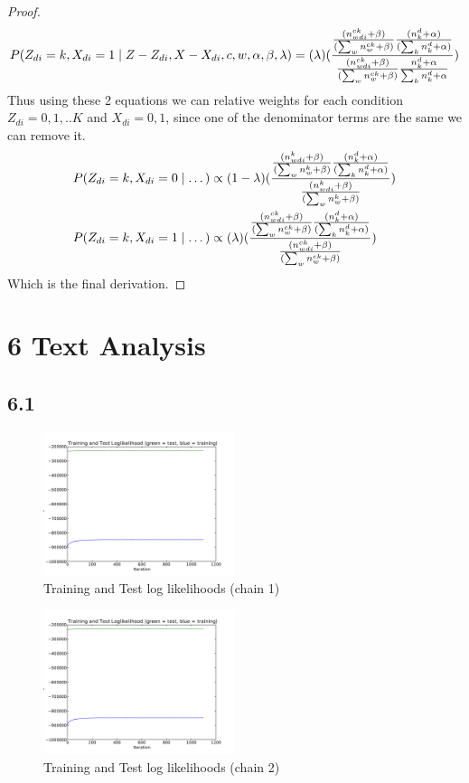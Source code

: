 \documentclass{article}
\begin{document}
\begin{proof}
\begin{align*}
P(Z_{di} = k, X_{di} =1 \mid Z - Z_{di}, X - X_{di}, c, w, \alpha,\beta,\lambda) &= (\lambda) (\frac {\frac{(n^{ck}_{wdi} + \beta)}{( \sum_w n^{ck}_w + \beta)} \frac{(n^d_k + \alpha)}{(\sum_k n^d_k + \alpha)}}{\frac{(n^{ck}_{wdi} + \beta)}{(\sum_w n^{ck}_w + \beta)} \frac{n^d_k + \alpha}{\sum_k n^d_k + \alpha}})\\
\end{align*}
 Thus using these 2 equations we can relative weights for each condition $Z_{di} = 0,1,..K$ and $X_{di} = 0,1$, since one of the denominator terms are the same we can remove it.
\begin{align*}
P(Z_{di} = k, X_{di} =0 \mid \dots) &\propto (1-\lambda) (\frac {\frac{(n^{k}_{wdi} + \beta)}{( \sum_w n^k_w + \beta)} \frac{(n^d_k + \alpha)}{( \sum_k n^d_k + \alpha)}}{\frac{(n^{k}_{wdi} + \beta)}{(\sum_w n^k_w + \beta)} })\\
P(Z_{di} = k, X_{di} =1 \mid \dots) &\propto (\lambda) (\frac {\frac{(n^{ck}_{wdi} + \beta)}{( \sum_w n^{ck}_w + \beta)} \frac{(n^d_k + \alpha)}{(\sum_k n^d_k + \alpha)}}{\frac{(n^{ck}_{wdi} + \beta)}{(\sum_w n^{ck}_w + \beta)} })\\
\end{align*}
Which is the final derivation.
\end{proof}


\section*{6 Text Analysis}
\subsection*{6.1}

\begin{figure}[H]
  \caption{Training and Test log likelihoods (chain 1)}
  \centering
    \includegraphics[width=0.5\textwidth]{q6_p1_1.pdf}
\end{figure}

\begin{figure}[H]
  \caption{Training and Test log likelihoods (chain 2)}
  \centering
    \includegraphics[width=0.5\textwidth]{q6_p1_2.pdf}
\end{figure}
\end{document}
